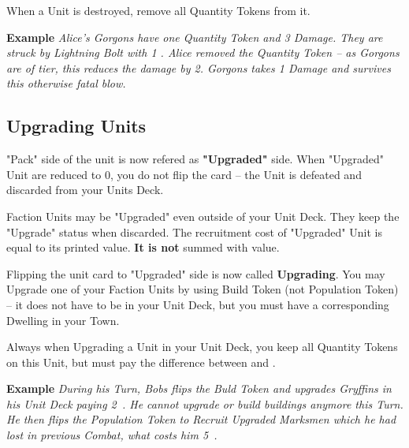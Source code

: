 \begin{multicols*}{2}
    
    When a Unit is destroyed, remove all Quantity Tokens from it.
    
    \textbf{Example} \textit{Alice's Gorgons have one Quantity Token and 3 Damage. They are struck by Lightning Bolt with 1 . Alice removed the Quantity Token -- as Gorgons are of  tier, this reduces the damage by 2. Gorgons takes 1 Damage and survives this otherwise fatal blow.}
    
    \subsection*{Upgrading Units}
    
    "Pack" side of the unit is now refered as \textbf{"Upgraded"} side. When "Upgraded" Unit  are reduced to $0$, you do not flip the card -- the Unit is defeated and discarded from your Units Deck.
    
    Faction Units may be "Upgraded" even outside of your Unit Deck. They keep the "Upgrade" status when discarded. The recruitment cost of "Upgraded" Unit is equal to its printed  value. \textbf{It is not} summed with  value.
    
    \medskip
    
    
    Flipping the unit card to "Upgraded" side is now called \textbf{Upgrading}. You may Upgrade one of your Faction Units by using Build Token (not Population Token) -- it does not have to be in your Unit Deck, but you must have a corresponding Dwelling in your Town. 
    
    Always when Upgrading a Unit in your Unit Deck, you keep all Quantity Tokens on this Unit, but must pay the difference between  and .
    
    \textbf{Example} \textit{During his Turn, Bobs flips the Buld Token and upgrades Gryffins in his Unit Deck paying 2~. He cannot upgrade or build buildings anymore this Turn. He then flips the Population Token to Recruit Upgraded Marksmen which he had lost in previous Combat, what costs him 5~.}
    

\end{multicols*}
